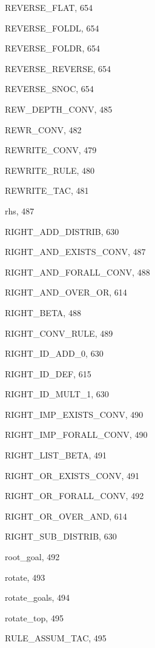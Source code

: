 \begin{theindex}
  \item {\ptt REVERSE\_FLAT}, 654
  \item {\ptt REVERSE\_FOLDL}, 654
  \item {\ptt REVERSE\_FOLDR}, 654
  \item {\ptt REVERSE\_REVERSE}, 654
  \item {\ptt REVERSE\_SNOC}, 654
  \item {\ptt REW\_DEPTH\_CONV}, 485
  \item {\ptt REWR\_CONV}, 482
  \item {\ptt REWRITE\_CONV}, 479
  \item {\ptt REWRITE\_RULE}, 480
  \item {\ptt REWRITE\_TAC}, 481
  \item {\ptt rhs}, 487
  \item {\ptt RIGHT\_ADD\_DISTRIB}, 630
  \item {\ptt RIGHT\_AND\_EXISTS\_CONV}, 487
  \item {\ptt RIGHT\_AND\_FORALL\_CONV}, 488
  \item {\ptt RIGHT\_AND\_OVER\_OR}, 614
  \item {\ptt RIGHT\_BETA}, 488
  \item {\ptt RIGHT\_CONV\_RULE}, 489
  \item {\ptt RIGHT\_ID\_ADD\_0}, 630
  \item {\ptt RIGHT\_ID\_DEF}, 615
  \item {\ptt RIGHT\_ID\_MULT\_1}, 630
  \item {\ptt RIGHT\_IMP\_EXISTS\_CONV}, 490
  \item {\ptt RIGHT\_IMP\_FORALL\_CONV}, 490
  \item {\ptt RIGHT\_LIST\_BETA}, 491
  \item {\ptt RIGHT\_OR\_EXISTS\_CONV}, 491
  \item {\ptt RIGHT\_OR\_FORALL\_CONV}, 492
  \item {\ptt RIGHT\_OR\_OVER\_AND}, 614
  \item {\ptt RIGHT\_SUB\_DISTRIB}, 630
  \item {\ptt root\_goal}, 492
  \item {\ptt rotate}, 493
  \item {\ptt rotate\_goals}, 494
  \item {\ptt rotate\_top}, 495
  \item {\ptt RULE\_ASSUM\_TAC}, 495

  \indexspace


\end{theindex}
